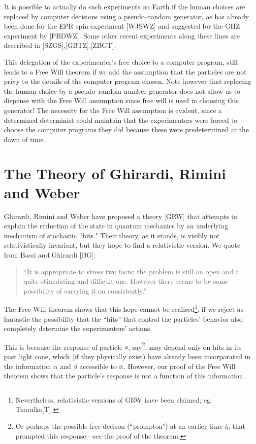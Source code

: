 \documentclass[12pt]{amsart}
\begin{document}
It is possible to actually do such experiments on Earth if the human
choices are replaced by computer decisions using a pseudo--random
generator, as has already been done for the EPR spin experiment [WJSWZ] 
and suggested for the GHZ experiment by [PBDWZ]. Some other recent experiments
along these lines are described in [SZGS],[GBTZ],[ZBGT].

This delegation of the experimenter's free choice to a computer program,
still leads to a Free Will theorem if we add the 
assumption that the particles are not privy to the details of the
computer program chosen.  Note however that replacing the human choice by a
pseudo--random number generator does not allow us to dispense with the Free 
Will assumption since free will is used in choosing this generator!  The
necessity for the Free Will assumption is evident, since a determined
determinist could maintain that the experimenters were forced to choose
the computer programs they did because these were predetermined at the
dawn of time.

\section{The Theory of Ghirardi, Rimini and Weber}

Ghirardi, Rimini and Weber have proposed a theory [GRW] that attempts to
explain the reduction of the state in quantum mechanics by an underlying
mechanism of stochastic ``hits."  Their theory, as it stands, is visibly not
relativistically invariant, but they hope to find a relativistic version.  
We quote from Bassi and Ghirardi [BG]:

\begin{quote}
\small
``It is appropriate to stress two facts: 
the problem is still an open and a quite
stimulating and difficult one. 
However there seems to be some possibility of carrying 
it on consistently.''
\end{quote}
\normalsize

\renewcommand{\thefootnote}{\fnsymbol{footnote}}

The Free Will theorem shows that this hope cannot be realised\footnote[1]{Nevertheless, relativistic versions of GRW have been claimed; eg. Tumulka[T].}, 
if we reject as fantastic the possibility that the ``hits'' 
that control the particles' behavior also completely
determine the experimenters' actions.

This is because the response of particle $a$, say\footnote{Or perhaps the possible free decison (``prompton") at an earlier 
time $t_0$ that prompted this response---see the proof of the theorem.}, may depend only 
on hits in its past light cone, which
(if they physically exist) have already been incorporated in 
the information $\alpha$ and $\beta$ accessible to it. 
However, our proof of the Free Will theorem shows that the particle's 
response is not a function of this information.
\end{document}
